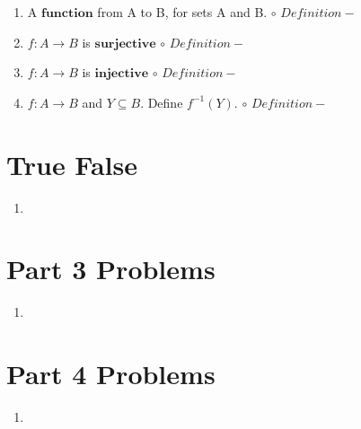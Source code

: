 \documentclass[11pt]{article}
\begin{document}
\begin{enumerate}
    \item A $\mathbf{function}$ from A to B, for sets A and B.
        \newline $\circ$ $Definition - $
    \item $f:A\rightarrow B$ is $\mathbf{surjective}$
        \newline $\circ$ $Definition - $
    \item $f:A\rightarrow B$ is $\mathbf{injective}$
        \newline $\circ$ $Definition - $
    \item $f:A\rightarrow B$ and $Y \subseteq B$. Define $f^{-1}(Y).$
        \newline $\circ$ $Definition - $
\end{enumerate}
\pagebreak

\section*{True False}
\begin{enumerate}
    \item 
\end{enumerate}
\pagebreak

\section{Part 3 Problems}
\begin{enumerate}
    \item 
\end{enumerate}
\pagebreak

\section{Part 4 Problems}
\begin{enumerate}
    \item 
\end{enumerate}
\pagebreak
\end{document}
